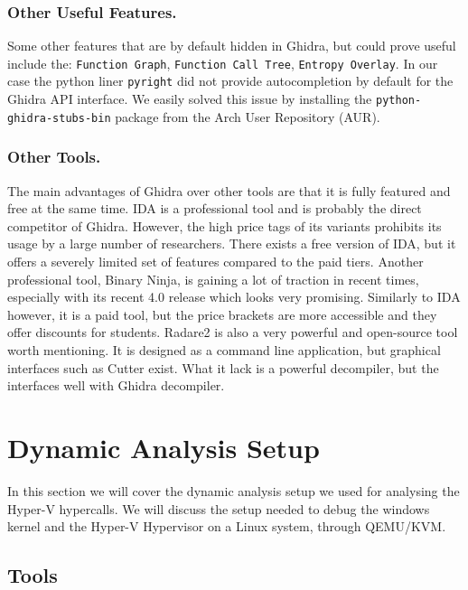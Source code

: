 \documentclass[runningheads]{llncs}
\newcommand{\cc}{\lstinline[mathescape]}
\begin{document}
\vspace{-5mm}
\subsubsection{Other Useful Features.}

Some other features that are by default hidden in Ghidra, but could prove
useful include the: \cc{Function Graph}, \cc{Function Call Tree}, 
\cc{Entropy Overlay}. In our case the python liner \cc{pyright} did not provide
autocompletion by default for the Ghidra API interface. We easily solved this
issue by installing the \cc{python-ghidra-stubs-bin} package from the Arch User
Repository (AUR).

\vspace{-2mm}
\subsubsection{Other Tools.}

The main advantages of Ghidra over other tools are that it is fully featured
and free at the same time. IDA is a professional tool and is probably the
direct competitor of Ghidra. However, the high price tags of its variants
prohibits its usage by a large number of researchers. There exists a free
version of IDA, but it offers a severely limited set of features compared to
the paid tiers. Another professional tool, Binary Ninja, is gaining a lot of
traction in recent times, especially with its recent 4.0 release which looks
very promising. Similarly to IDA however, it is a paid tool, but the price
brackets are more accessible and they offer discounts for students. Radare2 is
also a very powerful and open-source tool worth mentioning. It is designed as a
command line application, but graphical interfaces such as Cutter exist. What
it lack is a powerful decompiler, but the interfaces well with Ghidra
decompiler.

\section{Dynamic Analysis Setup}
\label{sec:dynamic}

In this section we will cover the dynamic analysis setup we used for analysing
the Hyper-V hypercalls. We will discuss the setup needed to debug the windows
kernel and the Hyper-V Hypervisor on a Linux system, through QEMU/KVM.

\subsection{Tools}
\end{document}
